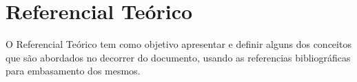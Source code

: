 \chapter[Referencial Teórico]{Referencial Teórico}
\label{cap:referencial}
O Referencial Teórico tem como objetivo apresentar e definir alguns dos conceitos que são abordados no decorrer do documento, usando as referencias bibliográficas para embasamento dos mesmos.





